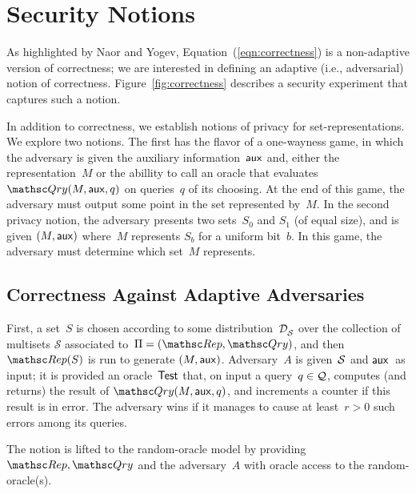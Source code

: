 \section{Security Notions}
\label{sec:security-notions}
As highlighted by Naor and Yogev, Equation~(\ref{eqn:correctness}) is a non-adaptive version of correctness;
we are interested in defining an adaptive (i.e., adversarial) notion
of correctness.   Figure~\ref{fig:correctness} describes a security experiment 
that captures such a notion.

In addition to correctness, we establish notions of privacy for set-representations.  We explore two notions.  The first has the flavor of a one-wayness game, in which the adversary is given the auxiliary information~${\sf aux}$ and, either the representation~$M$ or the abillity to call an oracle that evaluates $\Qry(M,\aux,q)$ on queries~$q$ of its choosing.  At the end of this game, the adversary must output some point in the set represented by~$M$.  In the second privacy notion, the adversary presents two sets~$S_0$ and $S_1$ (of equal size), and is given $(M,{\sf aux})$ where~$M$ represents $S_b$ for a uniform bit~$b$.  In this game, the adversary must determine which set~$M$ represents.

\subsection{Correctness Against Adaptive Adversaries}

First, a set~$S$ is chosen according to some
distribution~$\mathcal{D}_{{\cal S}}^{}$ over the collection of multisets
$\mathcal{S}$ associated to~$\Pi=(\Rep,\Qry)$, and then
$\Rep(S)$ is run to generate $(M,{\sf aux})$.
Adversary~$A$ is given~${\cal S}$ and ${\sf aux}$~as input; it is
provided an oracle~$\mathsf{Test}$ that, on input a query~$q \in {\cal Q}$,
computes (and returns) the result of $\Qry(M,\aux,q)$, and increments
a counter if this result is in error.  The adversary wins if it
manages to cause at least~$r>0$ such errors among its queries.

The notion is lifted to the random-oracle model by providing
$\Rep,\Qry$ and the adversary~$A$ with oracle access to the
random-oracle(s).



